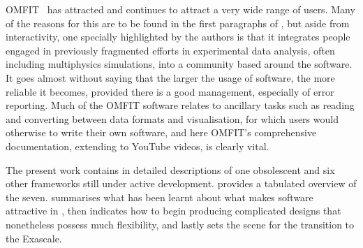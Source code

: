 OMFIT~\cite{Me15Inte} has attracted and continues to attract a very wide range of users.
Many of the reasons for this are to be found in the first paragraphs of ,
but aside from interactivity, one specially highlighted by
the authors is that it integrates people engaged in previously fragmented efforts in experimental
data analysis, often including multiphysics simulations, into
a community based around the software. It goes almost without saying
that the larger the usage of software, the more reliable it becomes,
provided there is a good management, especially of error reporting.
Much of the OMFIT software relates to ancillary tasks such as reading and
converting between data formats and visualisation, for which users would
otherwise to write their own software, and here OMFIT's comprehensive documentation,
extending to YouTube videos, is clearly vital.

The present work contains in  detailed descriptions of one
obsolescent and six other frameworks still under active development. 
 provides a tabulated overview of the seven.  summarises
what has been learnt about what makes software attractive in ,
then  indicates how
to begin producing complicated designs that nonetheless possess much flexibility,
and lastly  sets the scene for the transition to the Exascale.


%
%
%
%
%

